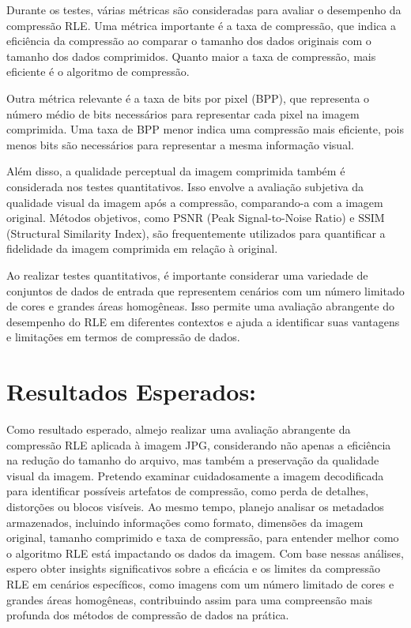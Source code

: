 \documentclass{article}
\begin{document}
Durante os testes, várias métricas são consideradas para avaliar o desempenho da compressão RLE. Uma métrica importante é a taxa de compressão, que indica a eficiência da compressão ao comparar o tamanho dos dados originais com o tamanho dos dados comprimidos. Quanto maior a taxa de compressão, mais eficiente é o algoritmo de compressão.

Outra métrica relevante é a taxa de bits por pixel (BPP), que representa o número médio de bits necessários para representar cada pixel na imagem comprimida. Uma taxa de BPP menor indica uma compressão mais eficiente, pois menos bits são necessários para representar a mesma informação visual.

Além disso, a qualidade perceptual da imagem comprimida também é considerada nos testes quantitativos. Isso envolve a avaliação subjetiva da qualidade visual da imagem após a compressão, comparando-a com a imagem original. Métodos objetivos, como PSNR (Peak Signal-to-Noise Ratio) e SSIM (Structural Similarity Index), são frequentemente utilizados para quantificar a fidelidade da imagem comprimida em relação à original.

Ao realizar testes quantitativos, é importante considerar uma variedade de conjuntos de dados de entrada que representem cenários com um número limitado de cores e grandes áreas homogêneas. Isso permite uma avaliação abrangente do desempenho do RLE em diferentes contextos e ajuda a identificar suas vantagens e limitações em termos de compressão de dados.

\section{Resultados Esperados:}

Como resultado esperado, almejo realizar uma avaliação abrangente da compressão RLE aplicada à imagem JPG, considerando não apenas a eficiência na redução do tamanho do arquivo, mas também a preservação da qualidade visual da imagem. Pretendo examinar cuidadosamente a imagem decodificada para identificar possíveis artefatos de compressão, como perda de detalhes, distorções ou blocos visíveis. Ao mesmo tempo, planejo analisar os metadados armazenados, incluindo informações como formato, dimensões da imagem original, tamanho comprimido e taxa de compressão, para entender melhor como o algoritmo RLE está impactando os dados da imagem. Com base nessas análises, espero obter insights significativos sobre a eficácia e os limites da compressão RLE em cenários específicos, como imagens com um número limitado de cores e grandes áreas homogêneas, contribuindo assim para uma compreensão mais profunda dos métodos de compressão de dados na prática.
\end{document}
